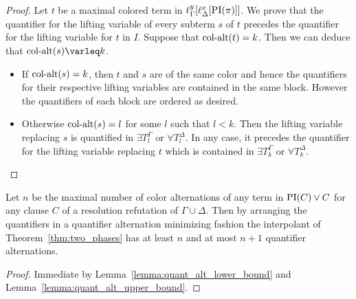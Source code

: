 \documentclass[%
	draft=false,%
	numbers=noendperiod,%
	11pt,%
	a4paper,%
	oneside,%
	openany,%
]{memoir}
\begin{document}
\begin{proof}
	Let $t$ be a maximal colored term in $\ell_{\Gamma}^{y}[\ell_{\Delta}^{x}[\operatorname{PI}(\pi)]]$. 
	We prove that the quantifier for the lifting variable of every subterm $s$ of $t$ precedes the quantifier for the lifting variable for $t$ in $I$.
	Suppose that $\operatorname{col-alt}(t) = k$. Then we can deduce that $\ca(s) \varleq\nolinebreak{} k$.
	\begin{itemize}
		\item
			If $\operatorname{col-alt}(s) = k$, then $t$ and $s$ are of the same color and hence the quantifiers for their respective lifting variables are contained in the same block. 
			However the quantifiers of each block are ordered as desired.
		\item
			Otherwise $\operatorname{col-alt}(s) = l$ for some $l$ such that $l < k$.
			Then the lifting variable replacing $s$ is quantified in
			$\exists T_{l}^\Gamma$ or
			$\forall T_{l}^\Delta$.
			In any case, it precedes the quantifier for the lifting variable replacing $t$ which is contained in 
			$\exists T_{k}^\Gamma$ or
			$\forall T_{k}^\Delta$.
			\qedhere
	\end{itemize}
\end{proof}

\begin{thm}
	Let $n$ be the maximal number of color alternations of any term in $\operatorname{PI}(C) \lor C$ for any clause $C$ of a resolution refutation of $\Gamma \cup \Delta$.
	Then by arranging the quantifiers in a quantifier alternation minimizing fashion the interpolant of Theorem~\ref{thm:two_phases} has at least $n$ and at most $n+1$ quantifier alternations.
\end{thm}
\begin{proof}
	Immediate by Lemma~\ref{lemma:quant_alt_lower_bound} and Lemma~\ref{lemma:quant_alt_upper_bound}.
\end{proof}


\begin{comment}
\begin{itemize}
	\item Supp $n = 0$. then no quantifiers
	\item Supp $n = 1$.
		then every term has at most one color. 
		Note that there are no subterm-relations between any two terms of different color.
		Hence
		$\forall x_{.} \quantifierdots \forall x_{.}
		\exists y_{.} \quantifierdots \exists y_{.} \lifboth{\PI(\pi)}$ is a minimal arrangement of quantifiers and has either $\ca(I) = 2$ or $\ca(I) = 1$ if there are only terms of one color.

	\item Supp works for $n$.

		not sure..
\end{itemize}


$ \forall x_{t^{\Delta_1}_1} \dots \forall x_{t^{\Delta_1}_{n_{|\Delta_1|}}} $
\end{comment}
\end{document}
